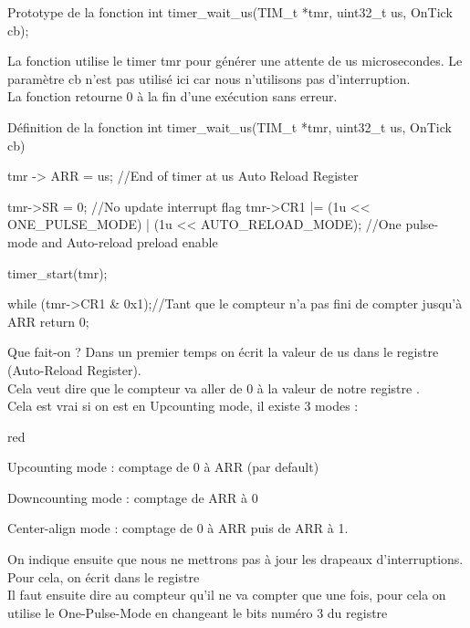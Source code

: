 {\begin{Cpp}{Prototype de la fonction} 
int timer_wait_us(TIM_t *tmr, uint32_t us, OnTick cb);
\end{Cpp}

La fonction utilise le timer tmr pour générer une attente de us microsecondes. Le paramètre cb n'est pas utilisé ici car nous n'utilisons pas d'interruption.\\
La fonction retourne 0 à la fin d'une exécution sans erreur. \\

\begin{Cpp}{Définition de la fonction} 
int timer_wait_us(TIM_t *tmr, uint32_t us, OnTick cb) 
{

tmr -> ARR = us;			//End of timer at us   Auto Reload Register
		
tmr->SR = 0; 														//No update interrupt flag
tmr->CR1 |=  (1u << ONE_PULSE_MODE) | (1u << AUTO_RELOAD_MODE);		//One pulse-mode and Auto-reload preload enable

timer_start(tmr);

while (tmr->CR1 & 0x1){};//Tant que le compteur n'a pas fini de compter jusqu'à ARR
return 0;
}
\end{Cpp}

Que fait-on ? Dans un premier temps on écrit la valeur de us dans le registre  (Auto-Reload Register).\\
Cela veut dire que le compteur va aller de 0 à la valeur de notre registre .\\
Cela est vrai si on est en Upcounting mode, il existe 3 modes : \\

\begin{items}{red}{\Triangle}
\item Upcounting mode : comptage de 0 à ARR (par default)
\item Downcounting mode : comptage de ARR à 0 
\item Center-align mode : comptage de 0 à ARR puis de ARR à 1.
\end{items}

On indique ensuite que nous ne mettrons pas à jour les drapeaux d'interruptions. Pour cela, on écrit  dans le registre \\
Il faut ensuite dire au compteur qu'il ne va compter que une fois, pour cela on utilise le One-Pulse-Mode en changeant le bits numéro 3 du registre  

}
